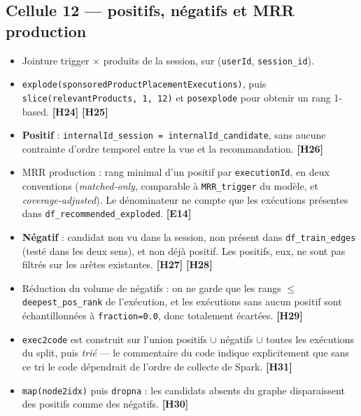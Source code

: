 \documentclass[11pt,a4paper]{article}
\newcommand{\code}[1]{\texttt{\small #1}}
\newcommand{\hyp}[1]{\textcolor{hypcol}{\textbf{\small [#1]}}}
\newcommand{\cell}[1]{\textbf{Cellule #1}}
\begin{document}
\subsection*{\cell{12} --- positifs, négatifs et MRR production}
\begin{itemize}[nosep,leftmargin=*]
  \item Jointure trigger $\times$ produits de la session, sur
        (\code{userId}, \code{session\_id}).
  \item \code{explode(sponsoredProductPlacementExecutions)}, puis
        \code{slice(relevantProducts, 1, 12)} et \code{posexplode} pour obtenir un
        rang 1-based. \hyp{H24} \hyp{H25}
  \item \textbf{Positif} : \code{internalId\_session = internalId\_candidate}, sans
        aucune contrainte d'ordre temporel entre la vue et la recommandation.
        \hyp{H26}
  \item MRR production : rang minimal d'un positif par \code{executionId}, en deux
        conventions (\emph{matched-only}, comparable à \code{MRR\_trigger} du modèle,
        et \emph{coverage-adjusted}). Le dénominateur ne compte que les exécutions
        présentes dans \code{df\_recommended\_exploded}. \hyp{E14}
  \item \textbf{Négatif} : candidat non vu dans la session, non présent dans
        \code{df\_train\_edges} (testé dans les deux sens), et non déjà positif.
        Les positifs, eux, ne sont pas filtrés sur les arêtes existantes.
        \hyp{H27} \hyp{H28}
  \item Réduction du volume de négatifs : on ne garde que les rangs
        $\le$ \code{deepest\_pos\_rank} de l'exécution, et les exécutions sans aucun
        positif sont échantillonnées à \code{fraction=0.0}, donc totalement
        écartées. \hyp{H29}
  \item \code{exec2code} est construit sur l'union positifs $\cup$ négatifs
        $\cup$ toutes les exécutions du split, puis \emph{trié} --- le commentaire du
        code indique explicitement que sans ce tri le code dépendrait de l'ordre de
        collecte de Spark. \hyp{H31}
  \item \code{map(node2idx)} puis \code{dropna} : les candidats absents du graphe
        disparaissent des positifs comme des négatifs. \hyp{H30}
\end{itemize}
\end{document}
